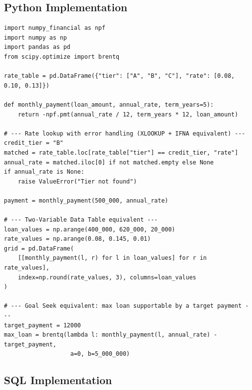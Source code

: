 \documentclass[11pt,a4paper]{article}
\begin{document}
\subsection{Python Implementation}

\begin{lstlisting}[style=pythonstyle, caption={The same model end-to-end: lookup, PMT, a sensitivity grid, and a Goal-Seek-style solve}]
import numpy_financial as npf
import numpy as np
import pandas as pd
from scipy.optimize import brentq

rate_table = pd.DataFrame({"tier": ["A", "B", "C"], "rate": [0.08, 0.10, 0.13]})

def monthly_payment(loan_amount, annual_rate, term_years=5):
    return -npf.pmt(annual_rate / 12, term_years * 12, loan_amount)

# --- Rate lookup with error handling (XLOOKUP + IFNA equivalent) ---
credit_tier = "B"
matched = rate_table.loc[rate_table["tier"] == credit_tier, "rate"]
annual_rate = matched.iloc[0] if not matched.empty else None
if annual_rate is None:
    raise ValueError("Tier not found")

payment = monthly_payment(500_000, annual_rate)

# --- Two-Variable Data Table equivalent ---
loan_values = np.arange(400_000, 620_000, 20_000)
rate_values = np.arange(0.08, 0.145, 0.01)
grid = pd.DataFrame(
    [[monthly_payment(l, r) for l in loan_values] for r in rate_values],
    index=np.round(rate_values, 3), columns=loan_values
)

# --- Goal Seek equivalent: max loan supportable by a target payment ---
target_payment = 12000
max_loan = brentq(lambda l: monthly_payment(l, annual_rate) - target_payment,
                   a=0, b=5_000_000)
\end{lstlisting}

\subsection{SQL Implementation}
\end{document}

